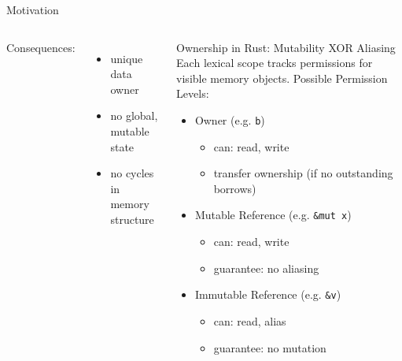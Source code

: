 \documentclass{sdqbeamer}
\newcommand{\code}[1]{\texttt{#1}}
\begin{document}
\begin{frame}[fragile]{Motivation}{}
	\begin{columns}
			Consequences:
			\begin{itemize}
				\item unique data owner
				\item no global, mutable state
				\item no cycles in memory structure
			\end{itemize}

		\begin{greenblock}{Ownership in Rust: Mutability XOR Aliasing}
			Each lexical scope tracks permissions for visible memory objects.
			Possible Permission Levels:
			\begin{itemize}
				\item Owner (e.g. \code{b})
					\begin{itemize}
						\item can: read, write
						\item transfer ownership (if no outstanding borrows)
					\end{itemize}
				\item Mutable Reference (e.g. \code{\&mut x})
					\begin{itemize}
						\item can: read, write
						\item guarantee: no aliasing
					\end{itemize}
				\item Immutable Reference (e.g. \code{\&v})
					\begin{itemize}
						\item can: read, alias
						\item guarantee: no mutation
					\end{itemize}
			\end{itemize}
		\end{greenblock}
	\end{columns}

\end{frame}
\end{document}
